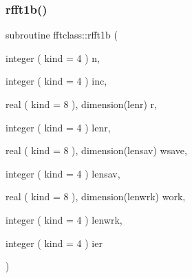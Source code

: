 \subsubsection{\texorpdfstring{rfft1b()}{rfft1b()}}
{\footnotesize\ttfamily subroutine fftclass\+::rfft1b (\begin{DoxyParamCaption}\item[{integer ( kind = 4 )}]{n,  }\item[{integer ( kind = 4 )}]{inc,  }\item[{real ( kind = 8 ), dimension(lenr)}]{r,  }\item[{integer ( kind = 4 )}]{lenr,  }\item[{real ( kind = 8 ), dimension(lensav)}]{wsave,  }\item[{integer ( kind = 4 )}]{lensav,  }\item[{real ( kind = 8 ), dimension(lenwrk)}]{work,  }\item[{integer ( kind = 4 )}]{lenwrk,  }\item[{integer ( kind = 4 )}]{ier }\end{DoxyParamCaption})}

